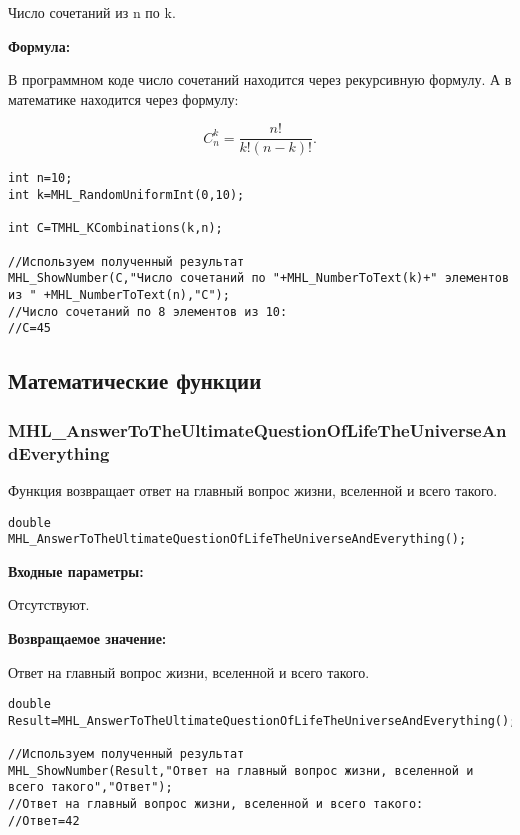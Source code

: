 \documentclass[a4paper,12pt]{article}
\begin{document}
 Число сочетаний из n по k.
 
 \textbf{Формула:}
 
 В программном коде число сочетаний находится через рекурсивную формулу. А в математике находится через формулу:
 
 \begin{equation*}
C_n^k=\dfrac{n!}{k!\left( n-k\right)! }.
\end{equation*}


\begin{lstlisting}[label=code_use_TMHL_KCombinations,caption=Пример использования]
int n=10;
int k=MHL_RandomUniformInt(0,10);

int C=TMHL_KCombinations(k,n);

//Используем полученный результат
MHL_ShowNumber(C,"Число сочетаний по "+MHL_NumberToText(k)+" элементов из " +MHL_NumberToText(n),"C");
//Число сочетаний по 8 элементов из 10:
//C=45
\end{lstlisting}

\subsection{Математические функции}

\subsubsection{MHL\_AnswerToTheUltimateQuestionOfLifeTheUniverseAndEverything}\label{MHL_AnswerToTheUltimateQuestionOfLifeTheUniverseAndEverything}

Функция возвращает ответ на главный вопрос жизни, вселенной и всего такого.


\begin{lstlisting}[label=code_syntax_MHL_AnswerToTheUltimateQuestionOfLifeTheUniverseAndEverything,caption=Синтаксис]
double MHL_AnswerToTheUltimateQuestionOfLifeTheUniverseAndEverything();
\end{lstlisting}

\textbf{Входные параметры:}  
 
Отсутствуют.

\textbf{Возвращаемое значение:}

Ответ на главный вопрос жизни, вселенной и всего такого.


\begin{lstlisting}[label=code_use_MHL_AnswerToTheUltimateQuestionOfLifeTheUniverseAndEverything,caption=Пример использования]
double Result=MHL_AnswerToTheUltimateQuestionOfLifeTheUniverseAndEverything();

//Используем полученный результат
MHL_ShowNumber(Result,"Ответ на главный вопрос жизни, вселенной и всего такого","Ответ");
//Ответ на главный вопрос жизни, вселенной и всего такого:
//Ответ=42
\end{lstlisting}
\end{document}
